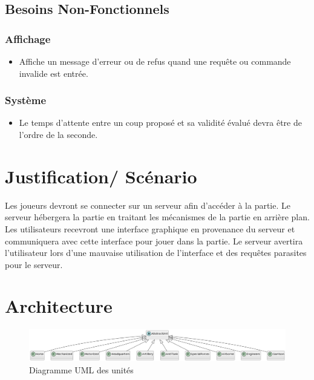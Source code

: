 \documentclass{article}[a4paper, 12pt]
\begin{document}
\subsection{Besoins Non-Fonctionnels}

\subsubsection{Affichage}
\begin{itemize}
    \item Affiche un message d'erreur ou de refus quand une requête ou commande invalide est entrée.
\end{itemize}

\subsubsection{Système}
\begin{itemize}
    \item Le temps d'attente entre un coup proposé et sa validité évalué devra être de l'ordre de la seconde.
\end{itemize}

\section{Justification/ Scénario}

Les joueurs devront se connecter sur un serveur afin d'accéder à la partie. Le serveur hébergera la partie en traitant les mécanismes de la partie en arrière plan. Les utilisateurs recevront une interface graphique en provenance du serveur et communiquera avec cette interface pour jouer dans la partie.
Le serveur avertira l'utilisateur lors d'une mauvaise utilisation de l'interface et des requêtes parasites pour le serveur.

\section{Architecture}


\begin{figure}[H]
\centering
\includegraphics[scale=0.3]{uml_abstract_unit.png}
\caption{Diagramme UML des unités}
\end{figure}
\end{document}
